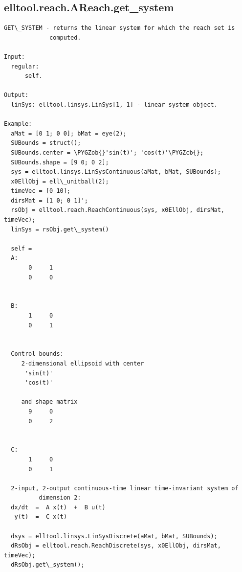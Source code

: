 \documentclass[letterpaper,10pt,english]{sphinxmanual}
\def\PYGZob{\char`\{}
\def\PYGZcb{\char`\}}
\begin{document}
\subsection{elltool.reach.AReach.get\_system}
\label{chap_functions:elltool-reach-areach-get-system}
\begin{Verbatim}[commandchars=\\\{\}]
GET\_SYSTEM - returns the linear system for which the reach set is
             computed.

Input:
  regular:
      self.

Output:
  linSys: elltool.linsys.LinSys[1, 1] - linear system object.

Example:
  aMat = [0 1; 0 0]; bMat = eye(2);
  SUBounds = struct();
  SUBounds.center = \PYGZob{}'sin(t)'; 'cos(t)'\PYGZcb{};
  SUBounds.shape = [9 0; 0 2];
  sys = elltool.linsys.LinSysContinuous(aMat, bMat, SUBounds);
  x0EllObj = ell\_unitball(2);
  timeVec = [0 10];
  dirsMat = [1 0; 0 1]';
  rsObj = elltool.reach.ReachContinuous(sys, x0EllObj, dirsMat, timeVec);
  linSys = rsObj.get\_system()

  self =
  A:
       0     1
       0     0


  B:
       1     0
       0     1


  Control bounds:
     2-dimensional ellipsoid with center
      'sin(t)'
      'cos(t)'

     and shape matrix
       9     0
       0     2


  C:
       1     0
       0     1

  2-input, 2-output continuous-time linear time-invariant system of
          dimension 2:
  dx/dt  =  A x(t)  +  B u(t)
   y(t)  =  C x(t)

  dsys = elltool.linsys.LinSysDiscrete(aMat, bMat, SUBounds);
  dRsObj = elltool.reach.ReachDiscrete(sys, x0EllObj, dirsMat, timeVec);
  dRsObj.get\_system();
\end{Verbatim}
\end{document}
